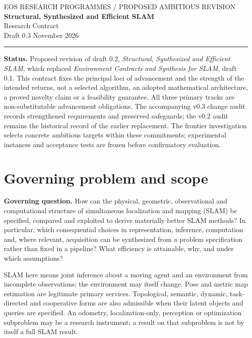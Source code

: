\documentclass[11pt,letterpaper]{article}
\begin{document}
\begin{center}
{\small\sffamily\color{muted} EOS RESEARCH PROGRAMMES \quad / \quad PROPOSED AMBITIOUS REVISION}\\[0.8em]
{\LARGE\bfseries\color{navy} Structural, Synthesized and Efficient SLAM}\\[0.4em]
{\large Research Contract}\\[0.7em]
{\small Draft 0.3  November 2026}
\end{center}
\vspace{0.25em}\hrule\vspace{0.5em}
\textbf{Status.} Proposed revision of draft 0.2, \emph{Structural, Synthesized and Efficient SLAM}, which replaced \emph{Environment Contracts and Synthesis for SLAM}, draft 0.1. This contract fixes the principal loci of advancement and the strength of the intended returns, not a selected algorithm, an adopted mathematical architecture, a proved novelty claim or a feasibility guarantee. All three primary tracks are non-substitutable advancement obligations. The accompanying v0.3 change audit records strengthened requirements and preserved safeguards; the v0.2 audit remains the historical record of the earlier replacement. The frontier investigation selects concrete ambitious targets within these commitments; experimental instances and acceptance tests are frozen before confirmatory evaluation.

\section{Governing problem and scope}
\textbf{Governing question.} How can the physical, geometric, observational and computational structure of simultaneous localization and mapping (SLAM) be specified, compared and exploited to derive materially better SLAM methods? In particular, which consequential choices in representation, inference, computation and, where relevant, acquisition can be synthesized from a problem specification rather than fixed in a pipeline? What efficiency is attainable, why, and under which assumptions?

SLAM here means joint inference about a moving agent and an environment from incomplete observations; the environment may itself change. Pose and metric map estimation are legitimate primary services. Topological, semantic, dynamic, task-directed and cooperative forms are also admissible when their latent objects and queries are specified. An odometry, localization-only, perception or optimization subproblem may be a research instrument; a result on that subproblem is not by itself a full SLAM result.
\end{document}
